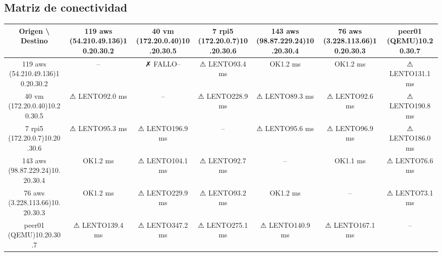 \documentclass[11pt,a4paper]{article}
\begin{document}
\subsection{Matriz de conectividad}
\begin{longtable}{|c|c|c|c|c|c|c|}
\hline
Origen \textbackslash{} Destino & 119 aws (54.210.49.136)10.20.30.2 & 40 vm (172.20.0.40)10.20.30.5 & 7 rpi5 (172.20.0.7)10.20.30.6 & 143 aws (98.87.229.24)10.20.30.4 & 76 aws (3.228.113.66)10.20.30.3 & peer01 (QEMU)10.20.30.7 \\ \hline
119 aws (54.210.49.136)10.20.30.2 & -- & ✗ FALLO-- & ⚠ LENTO93.4 ms & OK1.2 ms & OK1.2 ms & ⚠ LENTO131.1 ms \\ \hline
40 vm (172.20.0.40)10.20.30.5 & ⚠ LENTO92.0 ms & -- & ⚠ LENTO228.9 ms & ⚠ LENTO89.3 ms & ⚠ LENTO92.6 ms & ⚠ LENTO190.8 ms \\ \hline
7 rpi5 (172.20.0.7)10.20.30.6 & ⚠ LENTO95.3 ms & ⚠ LENTO196.9 ms & -- & ⚠ LENTO95.6 ms & ⚠ LENTO96.9 ms & ⚠ LENTO186.0 ms \\ \hline
143 aws (98.87.229.24)10.20.30.4 & OK1.2 ms & ⚠ LENTO104.1 ms & ⚠ LENTO92.7 ms & -- & OK1.1 ms & ⚠ LENTO76.6 ms \\ \hline
76 aws (3.228.113.66)10.20.30.3 & OK1.2 ms & ⚠ LENTO229.9 ms & ⚠ LENTO93.2 ms & OK1.2 ms & -- & ⚠ LENTO73.1 ms \\ \hline
peer01 (QEMU)10.20.30.7 & ⚠ LENTO139.4 ms & ⚠ LENTO347.2 ms & ⚠ LENTO275.1 ms & ⚠ LENTO140.9 ms & ⚠ LENTO167.1 ms & -- \\ \hline
\end{longtable}
\end{document}
